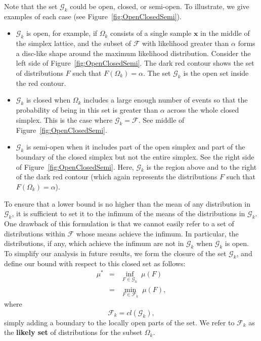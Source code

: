 \documentclass{article}
\theoremstyle{definition}
\theoremstyle{remark}
\def\x{\mathbf{x}}
\begin{document}
Note that the set $\mathcal{G}_k$ could be open, closed, or semi-open. To illustrate, we give examples of each case (see Figure~\ref{fig:OpenClosedSemi}).
\begin{itemize}
    \item $\mathcal{G}_k$ is open, for example, if $\Omega_k$ consists of a single sample $\x$ in the middle of the simplex lattice, and the subset of $\mathcal{F}$ with likelihood greater than $\alpha$ forms a disc-like shape around the maximum likelihood distribution. Consider the left side of Figure~\ref{fig:OpenClosedSemi}. The dark red contour shows the set of distributions $F$ such that $F(\Omega_k)=\alpha.$ The set $\mathcal{G}_k$ is  the open set inside the red contour.
    \item $\mathcal{G}_k$ is closed when $\Omega_k$ includes a large enough number of events so that the probability of being in this set is greater than $\alpha$ across the whole closed simplex. This is the case where $\mathcal{G}_k=\mathcal{F}$. See middle of Figure~\ref{fig:OpenClosedSemi}.
    \item $\mathcal{G}_k$ is semi-open when it includes part of the open simplex and part of the boundary of the closed simplex but not the entire simplex. See the right side of Figure~\ref{fig:OpenClosedSemi}. Here, $\mathcal{G}_k$ is the region above and to the right of the dark red contour (which again represents the distributions $F$ such that $F(\Omega_k)=\alpha$).
\end{itemize}

To ensure that a lower bound is no higher than the mean of any distribution in $\mathcal{G}_k$, it is sufficient to set it to the infimum of the means of the distributions in $\mathcal{G}_k$.  One drawback of this formulation is that we cannot easily refer to  a set of distributions within $\mathcal{F}$ whose means achieve the infimum. In particular, the distributions, if any, which achieve the infimum are not in $\mathcal{G}_k$ when $\mathcal{G}_k$ is open.  To simplify our analysis in future results, we form the closure of the set $\mathcal{G}_k$, and define our bound with respect to this closed set as follows:
\begin{eqnarray}
\mu^*&=& \inf_{F\in \mathcal{G}_k} \; \mu(F)\\
&=& \min_{F\in \mathcal{F}_k} \; \mu(F),
\end{eqnarray}
where 
$$
\mathcal{F}_k=cl(\mathcal{G}_k),$$
simply adding a boundary to the locally open parts of the set. We refer to $\mathcal{F}_k$ as the {\bf likely set} of distributions for the subset $\Omega_k$.
\end{document}
